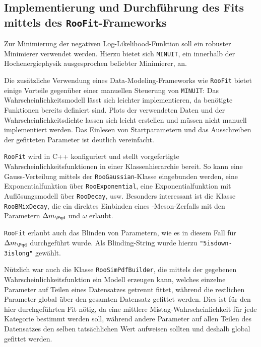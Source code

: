 

\subsection{Implementierung und Durchführung des Fits mittels des \texttt{RooFit}-Frameworks}

Zur Minimierung der negativen Log-Likelihood-Funktion soll ein robuster Minimierer verwendet werden.
Hierzu bietet sich \texttt{MINUIT}, ein innerhalb der Hochenergiephysik ausgesprochen beliebter Minimierer, an.

Die zusätzliche Verwendung eines Data-Modeling-Frameworks wie \texttt{RooFit} bietet einige Vorteile gegenüber einer manuellen Steuerung von \texttt{MINUIT}:
Das Wahrscheinlichkeitsmodell lässt sich leichter implementieren, da benötigte Funktionen bereits definiert sind.
Plots der verwendeten Daten und der Wahrscheinlichkeitsdichte lassen sich leicht erstellen und müssen nicht manuell implementiert werden.
Das Einlesen von Startparametern und das Ausschreiben der gefitteten Parameter ist deutlich vereinfacht.

\texttt{RooFit} wird in C++ konfiguriert und stellt vorgefertigte Wahrscheinlichkeitsfunktionen in einer Klassenhierarchie bereit.
So kann eine Gauss-Verteilung mittels der \texttt{RooGaussian}-Klasse eingebunden werden, eine Exponentialfunktion über \texttt{RooExponential}, eine Exponentialfunktion mit Auflösungsmodell über \texttt{RooDecay}, usw.
Besonders interessant ist die Klasse \texttt{RooBMixDecay}, die ein direktes Einbinden eines \PB-Meson-Zerfalls mit den Parametern $\difference{m_{\Pqd}}$ und $ω$ erlaubt.

\texttt{RooFit} erlaubt auch das Blinden von Parametern, wie es in diesem Fall für $\difference{m_{\Pqd}}$ durchgeführt wurde.
Als Blinding-String wurde hierzu \texttt{"5isdown-3islong"} gewählt.

Nützlich war auch die Klasse \texttt{RooSimPdfBuilder}, die mittels der gegebenen Wahrscheinlichkeitsfunktion ein Modell erzeugen kann, welches einzelne Parameter auf Teilen eines Datensatzes getrennt fittet, während die restlichen Parameter global über den gesamten Datensatz gefittet werden.
Dies ist für den hier durchgeführten Fit nötig, da eine mittlere Mistag-Wahrscheinlichkeit für jede Kategorie bestimmt werden soll, während andere Parameter auf allen Teilen des Datensatzes den selben tatsächlichen Wert aufweisen sollten und deshalb global gefittet werden.

